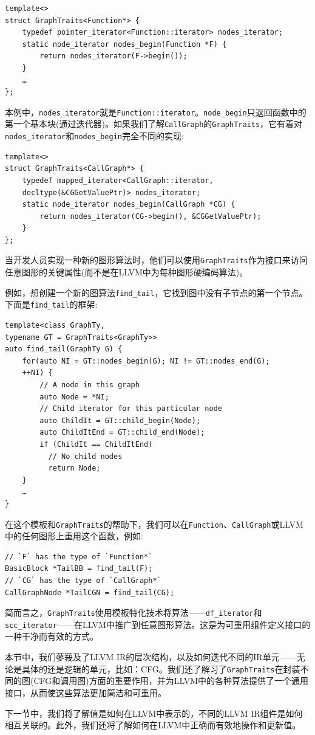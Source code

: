 \begin{lstlisting}[style=styleCXX]
template<>
struct GraphTraits<Function*> {
	typedef pointer_iterator<Function::iterator> nodes_iterator;
	static node_iterator nodes_begin(Function *F) {
		return nodes_iterator(F->begin());
	}
	…
};
\end{lstlisting}

本例中，\texttt{nodes\_iterator}就是\texttt{Function::iterator}。\texttt{node\_begin}只返回函数中的第一个基本块(通过迭代器)。如果我们了解\texttt{CallGraph}的\texttt{GraphTraits}，它有着对\texttt{nodes\_iterator}和\texttt{nodes\_begin}完全不同的实现:

\begin{lstlisting}[style=styleCXX]
template<>
struct GraphTraits<CallGraph*> {
	typedef mapped_iterator<CallGraph::iterator,
	decltype(&CGGetValuePtr)> nodes_iterator;
	static node_iterator nodes_begin(CallGraph *CG) {
		return nodes_iterator(CG->begin(), &CGGetValuePtr);
	}
};
\end{lstlisting}

当开发人员实现一种新的图形算法时，他们可以使用\texttt{GraphTraits}作为接口来访问任意图形的关键属性(而不是在LLVM中为每种图形硬编码算法)。

例如，想创建一个新的图算法\texttt{find\_tail}，它找到图中没有子节点的第一个节点。下面是\texttt{find\_tail}的框架:

\begin{lstlisting}[style=styleCXX]
template<class GraphTy,
typename GT = GraphTraits<GraphTy>>
auto find_tail(GraphTy G) {
	for(auto NI = GT::nodes_begin(G); NI != GT::nodes_end(G);
	++NI) {
		// A node in this graph
		auto Node = *NI;
		// Child iterator for this particular node
		auto ChildIt = GT::child_begin(Node);
		auto ChildItEnd = GT::child_end(Node);
		if (ChildIt == ChildItEnd)
		  // No child nodes
		  return Node;
	}
	…
}
\end{lstlisting}

在这个模板和\texttt{GraphTraits}的帮助下，我们可以在\texttt{Function}、\texttt{CallGraph}或LLVM中的任何图形上重用这个函数，例如:

\begin{lstlisting}[style=styleCXX]
// `F` has the type of `Function*`
BasicBlock *TailBB = find_tail(F);
// `CG` has the type of `CallGraph*`
CallGraphNode *TailCGN = find_tail(CG);
\end{lstlisting}

简而言之，\texttt{GraphTraits}使用模板特化技术将算法——\texttt{df\_iterator}和\texttt{scc\_iterator}——在LLVM中推广到任意图形算法。这是为可重用组件定义接口的一种干净而有效的方式。

本节中，我们蓼莪及了LLVM IR的层次结构，以及如何迭代不同的IR单元——无论是具体的还是逻辑的单元，比如：CFG。我们还了解习了\texttt{GraphTraits}在封装不同的图(CFG和调用图)方面的重要作用，并为LLVM中的各种算法提供了一个通用接口，从而使这些算法更加简洁和可重用。

下一节中，我们将了解值是如何在LLVM中表示的，不同的LLVM IR组件是如何相互关联的。此外，我们还将了解如何在LLVM中正确而有效地操作和更新值。












